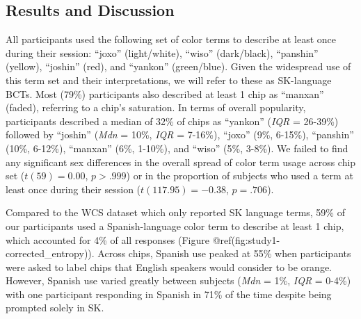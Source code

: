 \documentclass[
  english,
  ,man,floatsintext]{apa6}
\begin{document}
\hypertarget{results-and-discussion}{%
\subsection{Results and Discussion}\label{results-and-discussion}}

All participants used the following set of color terms to describe at least once during their session: \enquote{joxo} (light/white), \enquote{wiso} (dark/black), \enquote{panshin} (yellow), \enquote{joshin} (red), and \enquote{yankon} (green/blue). Given the widespread use of this term set and their interpretations, we will refer to these as SK-language BCTs. Most (79\%) participants also described at least 1 chip as \enquote{manxan} (faded), referring to a chip's saturation. In terms of overall popularity, participants described a median of 32\% of chips as \enquote{yankon} (\emph{IQR} = 26-39\%) followed by \enquote{joshin} (\emph{Mdn} = 10\%, \emph{IQR} = 7-16\%), \enquote{joxo} (9\%, 6-15\%), \enquote{panshin} (10\%, 6-12\%), \enquote{manxan} (6\%, 1-10\%), and \enquote{wiso} (5\%, 3-8\%). We failed to find any significant sex differences in the overall spread of color term usage across chip set (\(t(59) = 0.00\), \(p > .999\)) or in the proportion of subjects who used a term at least once during their session (\(t(117.95) = -0.38\), \(p = .706\)).

Compared to the WCS dataset which only reported SK language terms, 59\% of our participants used a Spanish-language color term to describe at least 1 chip, which accounted for 4\% of all responses (Figure @ref(fig:study1-corrected\_entropy)). Across chips, Spanish use peaked at 55\% when participants were asked to label chips that English speakers would consider to be orange. However, Spanish use varied greatly between subjects (\emph{Mdn} = 1\%, \emph{IQR} = 0-4\%) with one participant responding in Spanish in 71\% of the time despite being prompted solely in SK.
\end{document}
